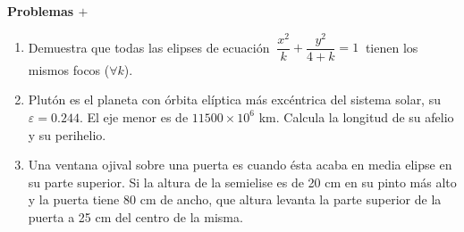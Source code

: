 \vspace{25mm}
\begin{adjustwidth}{50pt}{250pt}
\begin{cuadro-naranja}
\textbf{\huge{Problemas $\boldsymbol{+}$}}\normalsize{$\, $}
\end{cuadro-naranja}	
\end{adjustwidth}

\vspace{5mm}
\begin{enumerate}


\item	Demuestra que todas las elipses de ecuación $\ \dfrac{x^2}{k}+\dfrac{y^2}{4+k}=1\ $ tienen los mismos focos ($\forall k$).

\vspace{-4mm}
\begin{flushright}
\begin{footnotesize} \textcolor{gris}{}	\end{footnotesize}
\end{flushright}

\vspace{5mm}
\item	Plutón es el planeta con órbita elíptica más excéntrica del sistema solar, su $\varepsilon=0.244$. El eje menor es de $11500\times 10^6$ km. Calcula la longitud de su afelio y su perihelio.

\vspace{-4mm}
\begin{flushright}
\begin{footnotesize} \textcolor{gris}{}	\end{footnotesize}
\end{flushright}

\vspace{5mm}
\item	Una ventana ojival sobre una puerta es cuando ésta acaba en media elipse en su parte superior. Si la altura de la semielise es de 20 cm en su pinto más alto y la puerta tiene 80 cm de ancho, que altura levanta la parte superior de la puerta a 25 cm del centro de la misma.

\vspace{-4mm}
\begin{flushright}
\begin{footnotesize} \textcolor{gris}{}	\end{footnotesize}
\end{flushright}


\end{enumerate}
